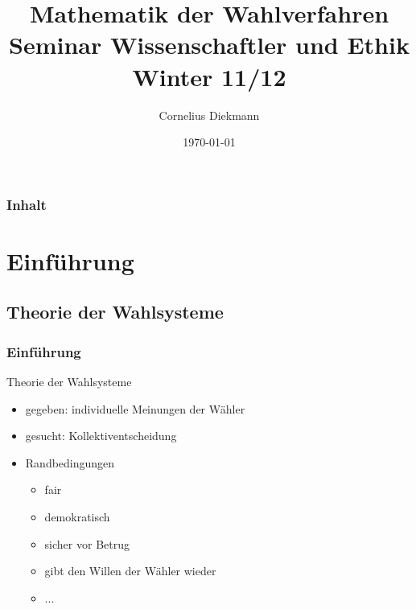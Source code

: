 \documentclass{beamer}
\title[Mathematik der Wahlverfahren]{
	\Large Mathematik der Wahlverfahren\\
	[5mm] \normalsize Seminar Wissenschaftler und Ethik \\
	Winter 11/12
}
\author{Cornelius Diekmann}
\institute[]{
	Fakult\"at f\"ur Informatik\\
	TU M\"unchen\\[3mm]
}
\date{\today}
\begin{document}
\begin{frame}
	\titlepage
\end{frame}

\begin{frame}
	\frametitle{Inhalt}
	\tableofcontents
\end{frame}

\section{Einführung}
\subsection{Theorie der Wahlsysteme}
\begin{frame}[fragile]
	\frametitle{Einführung}
	Theorie der Wahlsysteme
	\begin{itemize}
		\item gegeben: individuelle Meinungen der Wähler
		\item gesucht: Kollektiventscheidung
		\pause
		\item Randbedingungen
		\begin{itemize}
			\item fair
			\item demokratisch
			\item sicher vor Betrug
			\item gibt den Willen der Wähler wieder
			\item ...
		\end{itemize}
	\end{itemize}
\end{frame}
\end{document}
